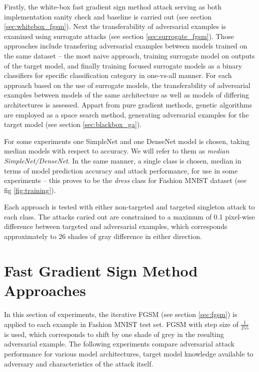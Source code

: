 Firstly, the white-box fast gradient sign method attack serving as both implementation sanity check and baseline is carried out (see section \ref{sec:whitebox_fgsm}). Next the transferability of adversarial examples is examined using surrogate attacks (see section \ref{sec:surrogate_fgsm}). Those approaches include transfering adversarial examples between models trained on the same dataset -- the most naive approach, training surrogate model on outputs of the target model, and finally training focused surrogate models as a binary classifiers for specific classification category in one-vs-all manner. For each approach based on the use of surrogate models, the transferability of adversarial examples between models of the same architecture as well as models of differing architectures is assessed. Appart from pure gradient methods, genetic algorithms are employed as a space search method, generating adversarial examples for the target model (see section \ref{sec:blackbox_ga}).

For some experiments one SimpleNet and one DenseNet model is chosen, taking median models with respect to accuracy. We will refer to them as \emph{median SimpleNet/DenseNet}. In the same manner, a single class is chosen, median in terms of model prediction accuracy and attack performance, for use in some experiments -- this proves to be the \emph{dress} class for Fashion MNIST dataset (see fig \ref{fig:training}).

Each approach is tested with either non-targeted and targeted singleton attack to each class. The attacks caried out are constrained to a maximum of 0.1 pixel-wise difference between targeted and adversarial examples, which corresponds approximately to 26 shades of gray difference in either direction.

\section{Fast Gradient Sign Method Approaches}
In this section of experiments, the iterative FGSM (see section \ref{sec:fgsm}) is applied to each example in Fashion MNIST test set. FGSM with step size of $\frac{1}{255}$ is used, which corresponds to shift by one shade of grey in the resulting adversarial example. The following experiments compare adversarial attack performance for various model architectures, target model knowledge available to adversary and characteristics of the attack itself.

